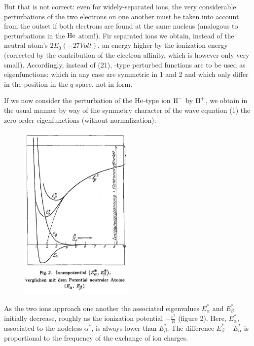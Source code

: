 \begin{paper}{1}
But that is not correct: even for widely-separated ions, the very considerable perturbations of the two electrons on one another must be taken into account from the outset if both electrons are found at the same nucleus (analogous to perturbations in the $\text{He}$ atom!). Fir separated ions we obtain, instead of the neutral atom's $2E_0(-27\unit{Volt})$, an energy higher by the ionization energy (corrected by the contribution of the electron affinity, which is however only very small). Accordingly, instead of (21), -type perturbed functions are to be used as eigenfunctions:
which in any case are symmetric in 1 and 2 and which only differ in the position in the $q$-space, not in form.

If we now consider the perturbation of the $\text{He}$-type ion $\text{H}^-$ by $\text{H}^+$, we obtain in the usual manner by way of the symmetry character of the wave equation (1) the zero-order eigenfunctions (without normalization):

\begin{figure}
		\includegraphics[width=0.5\textwidth]{fig2}
\end{figure}

As the two ions approach one another the associated eigenvalues $E_\alpha^*$ and $E_\beta^*$ initially decrease, roughly as the ionization potential $-\frac{\varepsilon^2}{R}$ (figure 2). Here, $E_\alpha^*$, associated to the nodeless $\alpha^*$, is always lower than $E_\beta^*$. The difference $E_\beta^* - E_\alpha^*$ is proportional to the frequency of the exchange of ion charges.


\end{paper}
